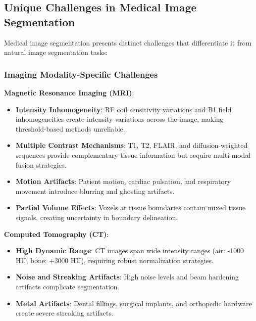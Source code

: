 \documentclass[12pt,a4paper]{article}
\begin{document}
\subsection{Unique Challenges in Medical Image Segmentation}

Medical image segmentation presents distinct challenges that differentiate it from natural image segmentation tasks:

\subsubsection{Imaging Modality-Specific Challenges}

\textbf{Magnetic Resonance Imaging (MRI)}:
\begin{itemize}
    \item \textbf{Intensity Inhomogeneity}: RF coil sensitivity variations and B1 field inhomogeneities create intensity variations across the image, making threshold-based methods unreliable.
    \item \textbf{Multiple Contrast Mechanisms}: T1, T2, FLAIR, and diffusion-weighted sequences provide complementary tissue information but require multi-modal fusion strategies.
    \item \textbf{Motion Artifacts}: Patient motion, cardiac pulsation, and respiratory movement introduce blurring and ghosting artifacts.
    \item \textbf{Partial Volume Effects}: Voxels at tissue boundaries contain mixed tissue signals, creating uncertainty in boundary delineation.
\end{itemize}

\textbf{Computed Tomography (CT)}:
\begin{itemize}
    \item \textbf{High Dynamic Range}: CT images span wide intensity ranges (air: -1000 HU, bone: +3000 HU), requiring robust normalization strategies.
    \item \textbf{Noise and Streaking Artifacts}: High noise levels and beam hardening artifacts complicate segmentation.
    \item \textbf{Metal Artifacts}: Dental fillings, surgical implants, and orthopedic hardware create severe streaking artifacts.
\end{itemize}
\end{document}
